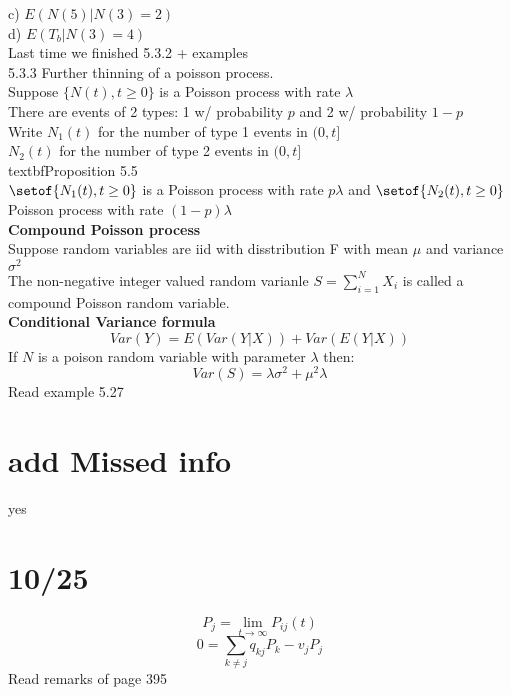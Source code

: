 \documentclass[answers,12pt,addpoints]{exam}
\begin{document}
c) $E(N(5) | N(3) = 2)$\\
d) $E(T_b | N(3) = 4)$\\
Last time we finished 5.3.2 + examples\\
5.3.3 Further thinning of a poisson process. \\
Suppose $\{N(t), t \geq 0\}$ is a Poisson process with rate $\lambda$\\
There are events of 2 types: 1 w/ probability $p$ and 2 w/ probability $1-p$\\
Write $N_1(t)$ for the number of type 1 events in $(0,t]$\\
$N_2(t)$ for the number of type 2 events in $(0,t]$\\
textbf{Proposition 5.5}\\
$\setof{N_1(t), t \geq 0}$ is a Poisson process with rate $p\lambda$ and $\setof{N_2(t), t \geq 0} $ Poisson process with rate $(1-p)\lambda$\\
\textbf{Compound Poisson process}\\
Suppose random variables are iid with disstribution F with mean $\mu$ and variance $\sigma^2$\\
The non-negative integer valued random varianle $S = \sum_{i=1}^{N} X_i$ is called a compound Poisson random variable.\\
\textbf{Conditional Variance formula}\\
$$Var(Y) = E(Var(Y|X)) + Var(E(Y|X))$$
If $N$ is a poison random variable with parameter $\lambda$ then:\\
$$Var(S) = \lambda \sigma^2 + \mu^2 \lambda$$
Read example 5.27\\
\section{add Missed info}
yes
\\
\section{10/25}
$$P_j = \lim_{t \to \infty} P_{ij}(t)$$
$$ 0 = \sum_{k \neq j} q_{kj}P_k - v_j P_j$$
Read remarks of page 395\\
\end{document}
